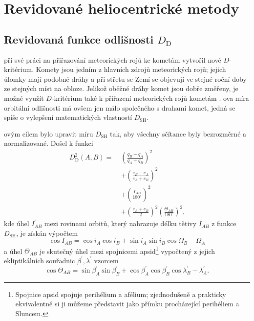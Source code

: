 \chapter{Revidované heliocentrické metody}%

\section{Revidovaná funkce odlišnosti $D_\text{D}$}%
\citeauthor{cometassoc} při své práci na přiřazování meteorických rojů ke kometám \cite{cometassoc} vytvořil nové $D$-kritérium. Komety jsou jedním z hlavních zdrojů meteorických rojů; jejich úlomky mají podobné dráhy a při střetu se Zemí se objevují ve stejné roční doby ze stejných míst na obloze. Jelikož oběžné dráhy komet jsou dobře změřeny, je možné využít $D$-kritérium také k přiřazení meteorických rojů kometám \cite{cometassoc}. \citeauthor{cometassoc}ova míra orbitální odlišnosti má ovšem jen málo společného s drahami komet, jedná se spíše o vylepšení matematických vlastností $D_\text{SH}$.

\citeauthor{cometassoc}ovým cílem bylo upravit míru $D_\text{SH}$ tak, aby všechny sčítance byly bezrozměrné a normalizované. Došel k funkci \cite{cometassoc}\cite{remarks}
\begin{equation}
    \begin{aligned}
        D_\text{D}^2(A,B)=\; & \left( \frac{q_B-q_A}{q_A+q_B} \right)^2                                                   \\
                             & +\left( \frac{e_B-e_A}{e_A+e_B} \right)^2                                                  \\
                             & +\left( \frac{I^\prime_{AB}}{180^\circ} \right)^2                                          \\
                             & +\left( \frac{e_A+e_B}{2} \right)^2\left( \frac{\Theta_{AB}}{180^\circ} \right)^2 \text{,}
    \end{aligned}
    \label{eqn:revised:d_d}
\end{equation}
kde úhel $I^\prime_{AB}$ mezi rovinami orbitů, který nahrazuje délku tětivy $I_{AB}$ z funkce $D_\text{SH}$, je získán výpočtem \cite{cometassoc}
\begin{equation}
    \cos{I_{AB}}=\cos{i_A}\cos{i_B}+\sin{i_A}\sin{i_B}\cos{\Omega_B-\Omega_A}
\end{equation}
a úhel $\Theta_{AB}$ je skutečný úhel mezi spojnicemi apsid\footnote{Spojnice apsid spojuje perihélium a afélium; zjednodušeně a prakticky ekvivalentně si ji můžeme představit jako přímku procházející perihéliem a Sluncem.} vypočtený z jejich ekliptikálních souřadnic $\beta^\prime,\lambda^\prime$ vzorcem \cite{cometassoc}
\begin{equation}
    \cos{\Theta_{AB}}=\sin{\beta^\prime_A}\sin{\beta^\prime_B}+\cos{\beta^\prime_A}\cos{\beta^\prime_B}\cos{\lambda^\prime_B-\lambda^\prime_A} \text{.}
\end{equation}

